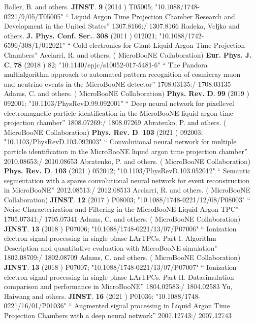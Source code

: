 \documentclass{article}
\begin{document}
\begin{thebibliography}{99}
  Baller, B. and others. {\bf  JINST}. {\bf  9} (2014 )  T05005;  "10.1088/1748-0221/9/05/T05005" `` Liquid Argon Time Projection Chamber Research and Development in the United States'' 1307.8166:/ 1307.8166
  Radeka, Veljko and others. {\bf  J. Phys. Conf. Ser.}. {\bf  308} (2011 )  012021;  "10.1088/1742-6596/308/1/012021" `` Cold electronics for Giant Liquid Argon Time Projection Chambers''
  Acciarri, R. and others. ( MicroBooNE Collaboration) {\bf  Eur. Phys. J. C}. {\bf  78} (2018 )  82;  "10.1140/epjc/s10052-017-5481-6" `` The Pandora multialgorithm approach to automated pattern recognition of cosmicray muon and neutrino events in the MicroBooNE detector'' 1708.03135:/ 1708.03135
  Adams, C. and others. ( MicroBooNE Collaboration) {\bf  Phys. Rev. D}. {\bf  99} (2019 )  092001;  "10.1103/PhysRevD.99.092001" `` Deep neural network for pixellevel electromagnetic particle identification in the MicroBooNE liquid argon time projection chamber'' 1808.07269:/ 1808.07269
  Abratenko, P. and others. ( MicroBooNE Collaboration) {\bf  Phys. Rev. D}. {\bf  103} (2021 )  092003;  "10.1103/PhysRevD.103.092003" `` Convolutional neural network for multiple particle identification in the MicroBooNE liquid argon time projection chamber'' 2010.08653:/ 2010.08653
  Abratenko, P. and others. ( MicroBooNE Collaboration) {\bf  Phys. Rev. D}. {\bf  103} (2021 )  052012;  "10.1103/PhysRevD.103.052012" `` Semantic segmentation with a sparse convolutional neural network for event reconstruction in MicroBooNE'' 2012.08513:/ 2012.08513
  Acciarri, R. and others. ( MicroBooNE Collaboration) {\bf  JINST}. {\bf  12} (2017 )  P08003;  "10.1088/1748-0221/12/08/P08003" `` Noise Characterization and Filtering in the MicroBooNE Liquid Argon TPC'' 1705.07341:/ 1705.07341
  Adams, C. and others. ( MicroBooNE Collaboration) {\bf  JINST}. {\bf  13} (2018 )  P07006;  "10.1088/1748-0221/13/07/P07006" `` Ionization electron signal processing in single phase LArTPCs. Part I. Algorithm Description and quantitative evaluation with MicroBooNE simulation'' 1802.08709:/ 1802.08709
  Adams, C. and others. ( MicroBooNE Collaboration) {\bf  JINST}. {\bf  13} (2018 )  P07007;  "10.1088/1748-0221/13/07/P07007" `` Ionization electron signal processing in single phase LArTPCs. Part II. Datasimulation comparison and performance in MicroBooNE'' 1804.02583:/ 1804.02583
  Yu, Haiwang and others. {\bf  JINST}. {\bf  16} (2021 )  P01036;  "10.1088/1748-0221/16/01/P01036" `` Augmented signal processing in Liquid Argon Time Projection Chambers with a deep neural network'' 2007.12743:/ 2007.12743

\end{thebibliography}
\end{document}
